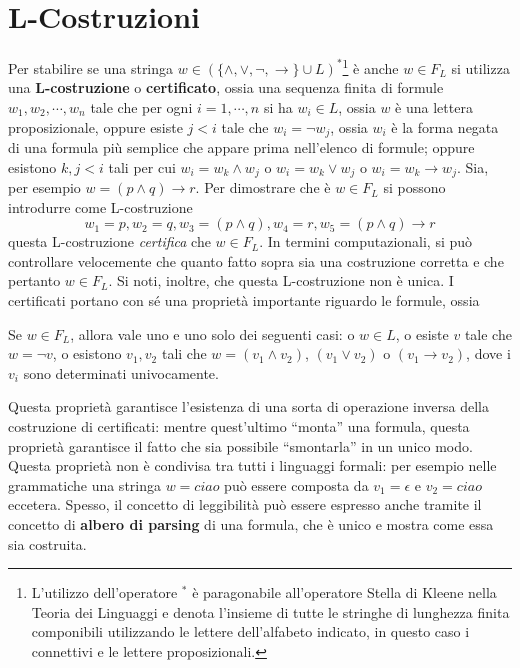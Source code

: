 \section{L-Costruzioni}
Per stabilire se una stringa $w \in (\{\land, \lor, \neg, \rightarrow\}
\cup L)^*$\footnote{L'utilizzo dell'operatore $^*$ è paragonabile all'operatore 
  Stella di Kleene nella Teoria dei Linguaggi e denota l'insieme di tutte le
  stringhe di lunghezza finita componibili utilizzando le lettere 
  dell'alfabeto indicato, in questo caso i connettivi e le lettere 
proposizionali.}
è anche $w \in F_L$ si utilizza una \textbf{L-costruzione} o 
\textbf{certificato}, ossia una sequenza finita di formule $w_1, w_2, \cdots, w_n$ tale che 
per ogni $i = 1,\cdots, n$ si ha $w_i \in L$, ossia 
$w$ è una lettera proposizionale, oppure esiste $j < i$ tale 
che $w_i = \neg w_j$, ossia $w_i$ è la forma negata 
di una formula più semplice che appare prima nell'elenco di 
formule; oppure esistono $k,j < i$ tali per cui 
$w_i = w_k \land w_j$ o $w_i = w_k \lor w_j$ o $w_i = w_k \rightarrow w_j$.
Sia, per esempio $w = (p\land q)\rightarrow r$. Per dimostrare che 
è $w \in F_L$ si possono introdurre come L-costruzione 
$$
w_1 = p, w_2 = q, w_3 = (p\land q), w_4 = r, w_5 = (p \land q) \rightarrow r
$$
questa L-costruzione \textit{certifica} che $w \in F_L$.
In termini computazionali, si può controllare velocemente che quanto fatto 
sopra sia una costruzione corretta e che pertanto $w \in F_L$. Si noti, inoltre, 
che questa L-costruzione non è unica. 
I certificati portano con sé una proprietà importante riguardo le formule, 
ossia 
\begin{pro}
Se $w \in F_L$, allora vale uno e uno solo dei seguenti casi: o $w \in L$, 
o esiste $v$ tale che $w = \neg v$, o esistono $v_1, v_2$ tali che 
$w = (v_1 \land v_2)$, 
$(v_1 \lor v_2)$ o $(v_1 \rightarrow v_2)$, dove i $v_i$ sono determinati 
univocamente. 
\end{pro}
Questa proprietà garantisce l'esistenza di una sorta di operazione 
inversa della costruzione di certificati: mentre quest'ultimo ``monta'' 
una formula, questa proprietà garantisce il fatto che sia possibile 
``smontarla'' in un unico modo.
Questa proprietà non è condivisa tra tutti i linguaggi formali: per 
esempio nelle grammatiche una stringa $w = ciao$ può essere composta da $v_1 = \epsilon$ 
e $v_2 = ciao$ eccetera. 
Spesso, il concetto di leggibilità può essere espresso anche tramite il concetto 
di \textbf{albero di parsing} di una formula, che è unico e mostra come 
essa sia costruita. 

